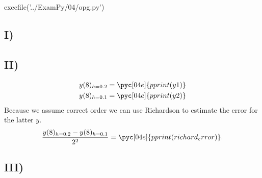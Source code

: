 \documentclass[../main.tex]{subfiles}
\begin{document}
\begin{pycode}[04e]
execfile('../ExamPy/04/opg.py')
\end{pycode}

\subsection*{I)}%
\label{sub:i_}


\subsection*{II)}%
\label{sub:ii_}


\begin{gather*}
	y(8)_{h=0.2} = \pyc[04e]{pprint(y1)}\\
	y(8)_{h=0.1} = \pyc[04e]{pprint(y2)}
\end{gather*}
Because we assume correct order we can use Richardson to estimate the error for the
latter $y$. \\
\[
	\frac{y(8)_{h=0.2}-y(8)_{h=0.1}}{2^{2}} = \pyc[04e]{pprint(richard_error)}
.\] 
\subsection*{III)}%
\label{sub:iii_}


\begin{figure}[ht]
\end{figure}
	

\inputminted{python}{../ExamPy/04/opg.py}
\end{document}
